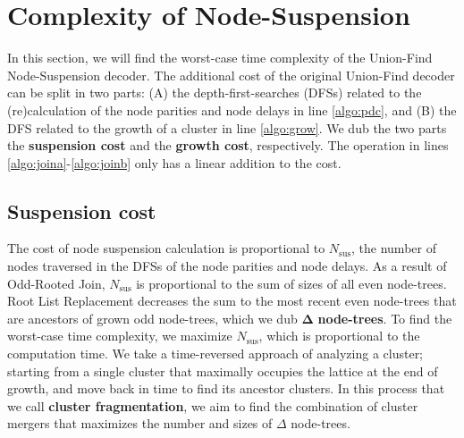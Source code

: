 
\section{Complexity of Node-Suspension}\label{sec:complexity}

In this section, we will find the worst-case time complexity of the Union-Find Node-Suspension decoder. The additional cost of the original Union-Find decoder can be split in two parts: (A) the depth-first-searches (DFSs) related to the (re)calculation of the node parities and node delays in line \ref{algo:pdc}, and (B) the DFS related to the growth of a cluster in line \ref{algo:grow}. We dub the two parts the \textbf{suspension cost} and the \textbf{growth cost}, respectively. The  operation in lines \ref{algo:joina}-\ref{algo:joinb} only has a linear addition to the cost.

\subsection{Suspension cost}\label{sec:suscomplexity}

The cost of node suspension calculation is proportional to $N_{\text{sus}}$, the number of nodes traversed in the DFSs of the node parities and node delays. As a result of Odd-Rooted Join, $N_{\text{sus}}$ is proportional to the sum of sizes of all even node-trees. Root List Replacement decreases the sum to the most recent even node-trees that are ancestors of grown odd node-trees, which we dub $\mathbf{\Delta}$ \textbf{node-trees}. To find the worst-case time complexity, we maximize $N_{\text{sus}}$, which is proportional to the computation time. We take a time-reversed approach of analyzing a cluster; starting from a single cluster that maximally occupies the lattice at the end of growth, and move back in time to find its ancestor clusters. In this process that we call \textbf{cluster fragmentation}, we aim to find the combination of cluster mergers that maximizes the number and sizes of $\Delta$ node-trees. 




